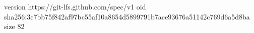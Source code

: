 version https://git-lfs.github.com/spec/v1
oid sha256:3c7bb75f842af97bc55af10a8654d5899791b7ace93676a51142c769d6a5d8ba
size 82
